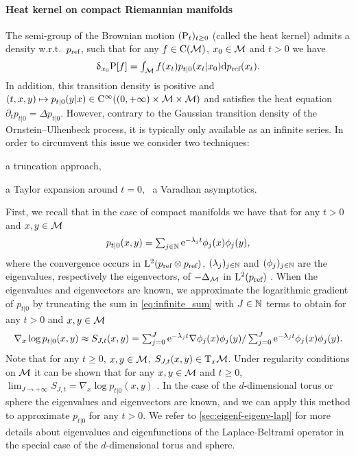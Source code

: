 \paragraph{Heat kernel on compact Riemannian manifolds}
The semi-group of the Brownian motion $(\mathrm{P}_t)_{t \geq 0}$ (called the heat
kernel) admits a density w.r.t.\ $p_{\textup{ref}}$, such that for any $f \in \mathrm{C}(\mathcal M)$,
$x_0 \in \mathcal M$ and $t > 0$ we have
\begin{equation}
  \textstyle{
    \updelta_{x_0} \mathrm{P}[f] = \int_{\mathcal M} f(x_t)p_{t|0}(x_t|x_0)  \mathrm{d}p_{\textup{ref}}(x_t).
    }
\end{equation}
In addition, this transition density is positive and
$(t,x,y) \mapsto p_{t|0}(y|x) \in \mathrm{C}^\infty(\left(0,+\infty\right) \times \mathcal M \times
\mathcal M)$ and satisfies the heat equation $\partial_t p_{t|0} = \Delta
p_{t|0}$. However, contrary to the Gaussian transition density of the
Ornstein--Ulhenbeck process, it is typically only available as an infinite
series. In order to circumvent this issue we consider two
techniques: \begin{enumerate*}[label=\roman*)]
\item a truncation approach, 
\item a Taylor expansion around $t=0$, \ie \ a Varadhan asymptotics.
\end{enumerate*}    
%
First, we recall that in the case of compact manifolds we have that for any
$t > 0$ and $x, y \in \mathcal M$
\begin{equation}
  \label{eq:infinite_sum}
  \textstyle{p_{t|0}(x,y) = \sum_{j \in \mathbb{N}} \mathrm{e}^{-\lambda_j t} \phi_j(x)\phi_j(y),}
\end{equation}
where the convergence occurs in $\mathrm{L}^2(p_{\textup{ref}} \otimes p_{\textup{ref}})$,
$(\lambda_j)_{j \in \mathbb{N}}$ and $(\phi_j)_{j \in \mathbb{N}}$ are the
eigenvalues, respectively the eigenvectors, of $-\Delta_\mathcal M$ in
$\mathrm{L}^2(p_{\textup{ref}})$ \cite[see][Section 2]{saloff1994precise}. When the eigenvalues and eigenvectors are known, we approximate the
logarithmic gradient of $p_{t|0}$ by truncating the sum in
\cref{eq:infinite_sum} with $J \in \mathbb{N}$ terms to obtain for any
$t > 0$ and $x,y \in \mathcal M$
\begin{equation}
  \nabla_x \log p_{t|0}(x,y) \approx \textstyle{S_{J,t}(x,y) = \sum_{j=0}^J \mathrm{e}^{-\lambda_j t} \nabla \phi_j(x) \phi_j(y) / \sum_{j=0}^J \mathrm{e}^{-\lambda_j t} \phi_j(x) \phi_j(y). }
\end{equation}    
Note that for any $t \geq 0$, $x, y\in \mathcal M$,
$S_{J,t}(x,y) \in \mathrm{T}_x \mathcal M$.  Under regularity conditions on $\mathcal M$ it can be
shown that for any $x,y \in \mathcal M$ and $t \geq 0$,
$\lim_{J \to +\infty} S_{J,t} = \nabla_x \log p_{t|0}(x,y)$ \cite[see][Lemma
1]{jones2008Manifold}. In the case of the $d$-dimensional torus or sphere
the eigenvalues and eigenvectors are known, \cite[see][Section
2]{saloff1994precise} and we can apply this method to approximate $p_{t|0}$
for any $t > 0$. We refer to \cref{sec:eigenf-eigenv-lapl} for more details
about eigenvalues and eigenfunctions of the Laplace-Beltrami operator in the
special case of the $d$-dimensional torus and sphere.  

